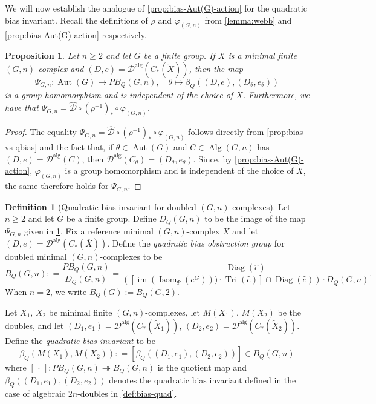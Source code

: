 \documentclass[11pt,a4paper,leqno]{amsart}
\newtheorem{proposition}[theorem]{Proposition}
\theoremstyle{definition}
\newtheorem{definition}[theorem]{Definition}
\theoremstyle{remark}
\newcommand{\wh}{\widehat}
\newcommand{\wt}{\widetilde}
\newcommand{\ol}{\overline}
\DeclareMathOperator{\Aut}{Aut}
\DeclareMathOperator{\IM}{im}
\DeclareMathOperator{\Isom}{Isom}
\DeclareMathOperator{\DiagIsom}{Diag}
\DeclareMathOperator{\Alg}{Alg}
\DeclareMathOperator{\alg}{alg}
\DeclareMathOperator{\TriIsom}{Tri}
\newcommand{\dalg}{\mathscr{D}^{\alg}}
\begin{document}
We will now establish the analogue of \cref{prop:bias-Aut(G)-action} for the quadratic bias invariant. Recall the definitions of $\rho$ and $\varphi_{(G,n)}$ from \cref{lemma:webb} and \cref{prop:bias-Aut(G)-action} respectively. 

\begin{proposition} \label{prop:quadratic-bias-Aut(G)-action}
Let	$n \ge 2$ and let $G$ be a finite group. If $X$ is a minimal finite $(G,n)$-complex and $(D,e) = \dalg(C_*(\wt X))$, then the map
\[ \Psi_{G,n}\colon  \Aut(G) \to PB_Q(G,n), \quad \theta \mapsto \beta_Q((D,e),(D_\theta,e_\theta))  \]
is a group homomorphism and is independent of the choice of $X$. Furthermore, we have that $\Psi_{G,n} = \wh{\mathscr{D}} \circ (\rho^{-1})_* \circ  \varphi_{(G,n)}$.
\end{proposition}

\begin{proof}
The equality $\Psi_{G,n} = \wh{\mathscr{D}} \circ (\rho^{-1})_* \circ  \varphi_{(G,n)}$ follows directly from \cref{prop:bias-vs-qbias} and the fact that, if $\theta \in \Aut(G)$ and $C \in \Alg(G,n)$ has $(D,e) = \mathscr{D}^{\alg}(C)$, then $\mathscr{D}^{\alg}(C_\theta) = (D_\theta,e_\theta)$. Since, by \cref{prop:bias-Aut(G)-action}, $\varphi_{(G,n)}$ is a group homomorphism and is independent of the choice of $X$, the same therefore holds for $\Psi_{G,n}$.
\end{proof}

\begin{definition}[Quadratic bias invariant for doubled $(G,n)$-complexes]
\label{def:quadbias-high}
Let $n \ge 2$ and let $G$ be a finite group. Define $D_Q(G,n)$ to be the image of the map $\Psi_{G,n}$ given in \cref{prop:quadratic-bias-Aut(G)-action}.
Fix a reference minimal $(G,n)$-complex $\ol{X}$ and let $(D,e) = \mathscr{D}^{\alg}(C_*(\ol{X}))$. Define the \textit{quadratic bias obstruction group} for doubled minimal $(G,n)$-complexes to be 
\[ B_Q(G,n)\colon = \frac{PB_Q(G,n)}{D_Q(G,n)} = \frac{\DiagIsom(\wh e)}{([\IM(\Isom_\Psi(e^G))) \cdot \TriIsom(\wh e)] \cap \DiagIsom(\wh e)) \cdot D_Q(G,n)}. \]
When $n = 2$, we write $B_Q(G):=B_Q(G,2)$.

Let $X_1$, $X_2$ be minimal finite $(G,n)$-complexes, let $M(X_1)$, $M(X_2)$ be the doubles, and let $(D_1,e_1) = \dalg(C_*(\wt X_1))$, $(D_2,e_2) = \dalg(C_*(\wt X_2))$.
Define the \textit{quadratic bias invariant} to be
\[ \beta_Q(M(X_1),M(X_2))\colon = [\beta_Q((D_1,e_1),(D_2,e_2))] \in B_Q(G,n) \]
where $[\,\cdot\,]\colon  PB_Q(G,n) \twoheadrightarrow B_Q(G,n)$ is the quotient map and $\beta_Q((D_1,e_1),(D_2,e_2))$ denotes the quadratic bias invariant defined in the case of algebraic $2n$-doubles in \cref{def:bias-quad}.
\end{definition}
\end{document}
